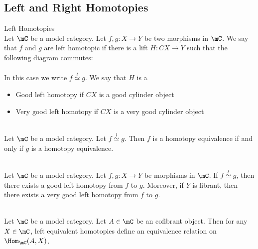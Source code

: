 \documentclass[a4paper]{article}
\begin{document}
\subsection{Left and Right Homotopies}
\begin{defn}{Left Homotopies}{}\\ Let $\mC$ be a model category. Let $f,g:X\to Y$ be two morphisms in $\mC$. We say that $f$ and $g$ are left homotopic if there is a lift $H:CX\to Y$ such that the following diagram commutes: \\
\\
In this case we write $f\overset{l}{\simeq}g$. We say that $H$ is a 
\begin{itemize}
\item Good left homotopy if $CX$ is a good cylinder object
\item Very good left homotopy if $CX$ is a very good cylinder object
\end{itemize}
\end{defn}

\begin{lmm}{}{}\\ Let $\mC$ be a model category. Let $f\overset{l}{\simeq}g$. Then $f$ is a homotopy equivalence if and only if $g$ is a homotopy equivalence. 
\end{lmm}

\begin{prp}{}{}\\ Let $\mC$ be a model category. Let $f,g:X\to Y$ be morphisms in $\mC$. If $f\overset{l}{\simeq}g$, then there exists a good left homotopy from $f$ to $g$. Moreover, if $Y$ is fibrant, then there exists a very good left homotopy from $f$ to $g$. 
\end{prp}

\begin{prp}{}{}\\ Let $\mC$ be a model category. Let $A\in\mC$ be an cofibrant object. Then for any $X\in\mC$, left equivalent homotopies define an equivalence relation on $\Hom_\mC(A,X)$. 
\end{prp}
\end{document}

